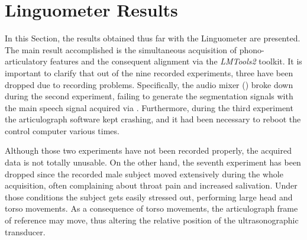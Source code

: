 \section{Linguometer Results}
\label{ch:results}
In this Section, the results obtained
thus far with the Linguometer are presented.
The main result accomplished
is the simultaneous acquisition of phono-articulatory features and the
consequent alignment via the \emph{LMTools2} toolkit.
It is important to clarify that out of the nine recorded experiments, three 
have been dropped due to recording problems.
Specifically, the audio mixer () broke down during the second
experiment, failing to generate the segmentation signals with the main speech 
signal acquired via .
Furthermore, during the third experiment the articulograph software kept 
crashing, and it had been necessary to reboot the control computer various
times.

Although those two experiments have not been recorded properly, the acquired 
data is not totally unusable.
On the other hand, the seventh experiment has been dropped since the recorded 
male subject moved extensively during the whole acquisition, often complaining
about throat pain and increased salivation.
Under those conditions the subject gets easily stressed out, performing
large head and torso movements.
As a consequence of torso movements, the articulograph frame of reference may
move, thus altering the relative position of the ultrasonographic transducer.


